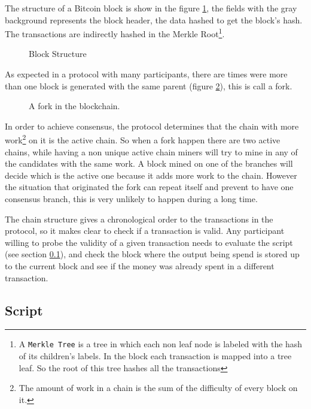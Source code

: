 The structure of a Bitcoin block is show in the figure \ref{fig:block_pow}, the
  fields with the gray background represents the block header, the data hashed
  to get the block's hash.
The transactions are indirectly hashed in the Merkle Root\footnote{A
  \texttt{Merkle Tree} is a tree in which each non leaf node is labeled with
  the hash of its children's labels. In the block each transaction is mapped
  into a tree leaf. So the root of this tree hashes all the transactions}.

  \begin{figure}[ht]
	\centering
	
	\caption{Block Structure}
	\label{fig:block_pow}
\end{figure}

As expected in a protocol with many participants, there are times were more
  than one block is generated with the same parent (figure
  \ref{fig:chain_fork}), this is call a fork.

\begin{figure}
	\centering
	\def\svgwidth{\columnwidth}
	
	\caption{A fork in the blockchain.}
	\label{fig:chain_fork}
\end{figure}

In order to achieve consensus, the protocol determines that the chain with
  more work\footnote{The amount of work in a chain is the sum of the difficulty
  of every block on it.} on it is the active chain.
So when a fork happen there are two active chains, while having a non unique
  active chain miners will try to mine in any of the candidates with the same
  work.
A block mined on one of the branches will decide which is the active one
  because it adds more work to the chain. However the situation that originated
  the fork can repeat itself and prevent to have one consensus branch, this is
  very unlikely\cite{decker2013information} to happen during a long time.

The chain structure gives a chronological order to the transactions in the
  protocol, so it makes clear to check if a transaction is valid.
Any participant willing to probe the validity of a given transaction needs
  to evaluate the script (see section \ref{subsec:script}), and  check the block
  where the output being spend is stored up to the current block and see if the
  money was already spent in a different transaction.

  \subsection{Script} \label{subsec:script}

